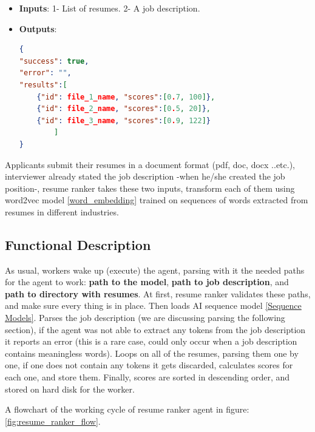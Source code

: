 \begin{itemize}
    \item \textbf{Inputs}: 1- List of resumes. 2- A job description.
    \item \textbf{Outputs}: 
    \begin{lstlisting}[language=json,firstnumber=1]
{
"success": true,
"error": "",
"results":[
    {"id": file_1_name, "scores":[0.7, 100]},
    {"id": file_2_name, "scores":[0.5, 20]},
    {"id": file_3_name, "scores":[0.9, 122]}
        ]
}
    \end{lstlisting}
\end{itemize}

Applicants submit their resumes in a document format (pdf, doc, docx ..etc.), interviewer already stated the job description -when he/she created the job position-, resume ranker takes these two inputs, transform each of them using word2vec model \ref{word_embedding}  trained on sequences of words extracted from resumes in different industries.

\subsection{Functional Description}
As usual, workers wake up (execute) the agent, parsing with it the needed paths for the agent to work: \textbf{path to the model}, \textbf{path to job description}, and \textbf{path to directory with resumes}. At first, resume ranker validates these paths, and make sure every thing is in place. Then loads AI sequence model \ref{Sequence Models}. Parses the job description (we are discussing parsing the following section), if the agent was not able to extract any tokens from the job description it reports an error (this is a rare case, could only occur when a job description contains meaningless words). Loops on all of the resumes, parsing them one by one, if one does not contain any tokens it gets discarded, calculates scores for each one, and store them. Finally, scores are sorted in descending order, and stored on hard disk for the worker.

A flowchart of the working cycle of resume ranker agent in figure: \ref{fig:resume_ranker_flow}.

